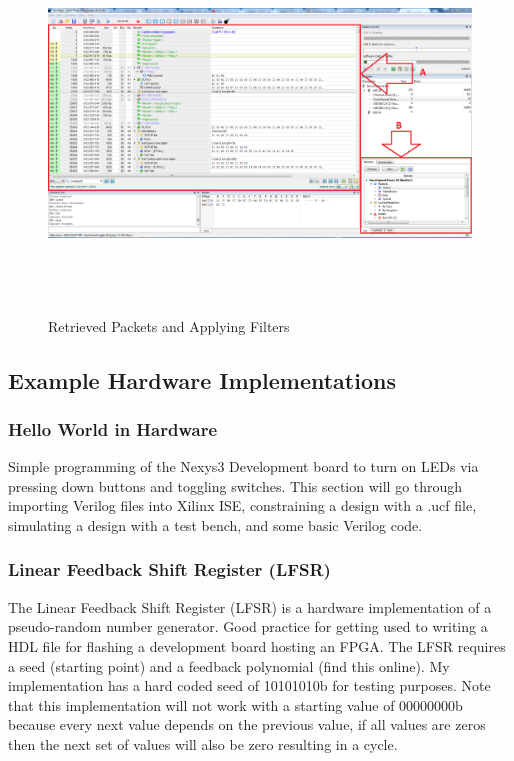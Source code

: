 \documentclass[10pt,a4paper]{article}
\begin{document}
\begin{figure}[h]
	\includegraphics[width=12cm,height=10cm]{Data_Center_Packets.PNG}
	\caption{Retrieved Packets and Applying Filters}
	\label{fig:Retrieved Packets and Applying Filters}
\end{figure}

\subsection{Example Hardware Implementations}
\subsubsection{Hello World in Hardware}
Simple programming of the Nexys3 Development board to turn on LEDs via pressing down buttons and toggling switches. This section will go through importing Verilog files into Xilinx ISE, constraining a design with a .ucf file, simulating a design with a test bench, and some basic Verilog code.
\subsubsection{Linear Feedback Shift Register (LFSR)}
The Linear Feedback Shift Register (LFSR) is a hardware implementation of a pseudo-random number generator. Good practice for getting used to writing a HDL file for flashing a development board hosting an FPGA. The LFSR requires a seed (starting point) and a feedback polynomial (find this online). My implementation has a hard coded seed of 10101010b for testing purposes. Note that this implementation will not work with a starting value of 00000000b because every next value depends on the previous value, if all values are zeros then the next set of values will also be zero resulting in a cycle.
\end{document}
